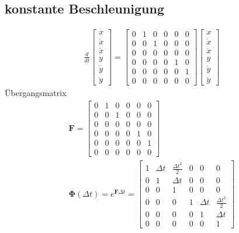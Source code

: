 \subsection{konstante Beschleunigung}
\begin{gather}
\frac{d}{dt}\begin{bmatrix}
x \\
\dot{x} \\
\ddot{x} \\
y \\
\dot{y} \\
\ddot{y}
\end{bmatrix} = \begin{bmatrix}
0 & 1 & 0 & 0 & 0 & 0\\
0 & 0 & 1 & 0 & 0 & 0\\
0 & 0 & 0 & 0 & 0 & 0\\
0 & 0 & 0 & 0 & 1 & 0\\
0 & 0 & 0 & 0 & 0 & 1\\
0 & 0 & 0 & 0 & 0 & 0
\end{bmatrix}\begin{bmatrix}
x \\
\dot{x} \\
\ddot{x} \\
y \\
\dot{y} \\
\ddot{y}
\end{bmatrix}
\end{gather}
Übergangsmatrix
\begin{gather}
	\bm{F} = \begin{bmatrix}
	0 & 1 & 0 & 0 & 0 & 0\\
	0 & 0 & 1 & 0 & 0 & 0\\
	0 & 0 & 0 & 0 & 0 & 0\\
	0 & 0 & 0 & 0 & 1 & 0\\
	0 & 0 & 0 & 0 & 0 & 1\\
	0 & 0 & 0 & 0 & 0 & 0
	\end{bmatrix} \\
	\bm{\Phi}(\Delta t)= e^{\bm{F}\Delta t}= \begin{bmatrix}
	1 & \Delta t & \frac{\Delta t^2}{2} & 0 & 0 & 0\\
	0 & 1 & \Delta t & 0 & 0 & 0\\
	0 & 0 & 1 & 0 & 0 & 0\\
	0 & 0 & 0 & 1 & \Delta t & \frac{\Delta t^2}{2}\\
	0 & 0 & 0 & 0 & 1 & \Delta t\\
	0 & 0 & 0 & 0 & 0 & 1
	\end{bmatrix}
\end{gather}
\clearpage
